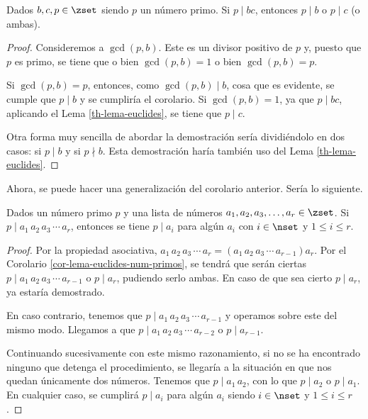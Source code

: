 \begin{corollary}\label{cor-lema-euclides-num-primos}
  Dados $b, c, p \in \zset$ siendo $p$ un número primo. Si $p \mid bc$, entonces
  $p \mid b$ o $p \mid c$ (o ambas).
\end{corollary}

\begin{proof}
  Consideremos a $\gcd(p, b)$. Este es un divisor positivo de $p$ y, puesto que
  $p$ es primo, se tiene que o bien $\gcd(p, b) = 1$ o bien $\gcd(p, b) = p$.

  Si $\gcd(p, b) = p$, entonces, como $\gcd(p, b) \mid b$, cosa que es
  evidente, se cumple que $p \mid b$ y se cumpliría el corolario. Si
  $\gcd(p, b) = 1$, ya que $p \mid bc$, aplicando el Lema
  \ref{th-lema-euclides}, se tiene que $p \mid c$.

  Otra forma muy sencilla de abordar la demostración sería dividiéndolo en dos
  casos: si $p \mid b$ y si $p \nmid b$. Esta demostración haría también uso del
  Lema \ref{th-lema-euclides}.
\end{proof}

Ahora, se puede hacer una generalización del corolario anterior. Sería lo
siguiente.

\begin{corollary}\label{lema-euclides-cor-2}
  Dados un número primo $p$ y una lista de números $a_1, a_2, a_3, \ldots,
  a_r \in \zset$. Si $p \mid a_1 \, a_2 \, a_3 \, \cdots \, a_r$, entonces
  se tiene $p \mid a_i$ para algún $a_i$ con $i \in \nset$ y $1 \leq i \leq
  r$.
\end{corollary}

\begin{proof}
  Por la propiedad asociativa, $a_1 \, a_2 \, a_3 \, \cdots \, a_r = (a_1 \,
  a_2 \, a_3 \, \cdots \, a_{r-1}) a_r $. Por el Corolario
  \ref{cor-lema-euclides-num-primos}, se tendrá que serán ciertas $p \mid
  a_1 \, a_2 \, a_3 \, \cdots \, a_{r-1}$ o $p \mid a_r$, pudiendo serlo
  ambas. En caso de que sea cierto $p \mid a_r$, ya estaría demostrado.

  En caso contrario, tenemos que $p \mid a_1 \, a_2 \, a_3 \, \cdots \,
  a_{r-1}$ y operamos sobre este del mismo modo. Llegamos a que $p \mid a_1
  \, a_2 \, a_3 \, \cdots \, a_{r-2}$ o $p \mid a_{r-1}$.

  Continuando sucesivamente con este mismo razonamiento, si no se ha
  encontrado ninguno que detenga el procedimiento, se llegaría a la
  situación en que nos quedan únicamente dos números. Tenemos que $p \mid
  a_1 \, a_2$, con lo que $p \mid a_2$ o $p \mid a_1$. En cualquier caso, se
  cumplirá $p \mid a_i$ para algún $a_i$ siendo $i \in \nset$ y $1 \leq i
  \leq r$.
\end{proof}

